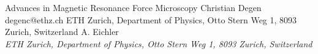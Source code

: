 \begin{conf-abstract}[]
{Advances in Magnetic Resonance Force Microscopy}
{\color{blue} Christian Degen}
{degenc@ethz.ch}
{ETH Zurich, Department of Physics, Otto Stern Weg 1, 8093 Zurich, Switzerland}
{{\color{blue}A. Eichler}\\ \textit{ETH Zurich, Department of Physics, Otto Stern Weg 1, 8093 Zurich, Switzerland}\\ 
\decofourleft \decofourright}





\printbibliography[heading=none]

\end{conf-abstract}
